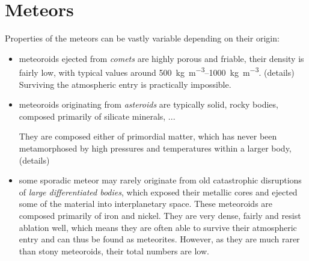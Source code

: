 \section{Meteors} \label{al}
    Properties of the meteors can be vastly variable depending on their origin:
    \begin{itemize}
        \item meteoroids ejected from \emph{comets} are highly porous and friable,
            their density is fairly low, with typical values around \SIrange{500}{1000}{\kilo\gram\per\cubic\metre}.
            (details)
            Surviving the atmospheric entry is practically impossible.
        \item meteoroids originating from \emph{asteroids} are typically solid,
            rocky bodies, composed primarily of silicate minerals, ...

            They are composed either of primordial matter, which has never been metamorphosed by high pressures
            and temperatures within a larger body,
            (details)
        \item some sporadic meteor may rarely originate from old catastrophic disruptions
            of \emph{large differentiated bodies}, which exposed their metallic cores
            and ejected some of the material into interplanetary space.
            These meteoroids are composed primarily of iron and nickel.
            They are very dense, fairly  and resist ablation well,
            which means they are often able to survive their atmospheric
            entry and can thus be found as meteorites.
            However, as they are much rarer than stony meteoroids,
            their total numbers are low.
    \end{itemize}
